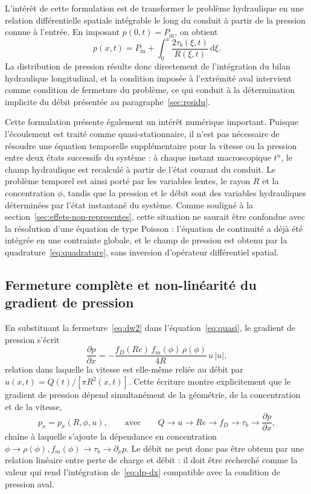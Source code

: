 \documentclass[11pt,a4paper]{report}
\begin{document}
L'intérêt de cette formulation est de transformer le problème hydraulique en une relation différentielle
spatiale intégrable le long du conduit à partir de la pression connue à l'entrée. En imposant
\(p(0,t) = P_{\mathrm{in}}\), on obtient
\begin{equation}
p(x,t) = P_{\mathrm{in}} + \int_0^x \frac{2\tau_b(\xi,t)}{R(\xi,t)}\,\mathrm{d}\xi .
\label{eq:quadrature}
\end{equation}
La distribution de pression résulte donc directement de l'intégration du bilan hydraulique longitudinal,
et la condition imposée à l'extrémité aval intervient comme condition de fermeture du problème, ce qui
conduit à la détermination implicite du débit présentée au paragraphe~\ref{sec:residu}.

Cette formulation présente également un intérêt numérique important. Puisque l'écoulement est traité comme
quasi-stationnaire, il n'est pas nécessaire de résoudre une équation temporelle supplémentaire pour la
vitesse ou la pression entre deux états successifs du système : à chaque instant macroscopique \(t^n\), le
champ hydraulique est recalculé à partir de l'état courant du conduit. Le problème temporel est ainsi
porté par les variables lentes, le rayon \(R\) et la concentration \(\phi\), tandis que la pression et le
débit sont des variables hydrauliques déterminées par l'état instantané du système. Comme souligné à la
section~\ref{sec:effets-non-representes}, cette situation ne saurait être confondue avec la résolution
d'une équation de type Poisson : l'équation de continuité a déjà été intégrée en une contrainte globale,
et le champ de pression est obtenu par la quadrature~\eqref{eq:quadrature}, sans inversion d'opérateur
différentiel spatial.

\subsection{Fermeture complète et non-linéarité du gradient de pression}

En substituant la fermeture~\eqref{eq:dw2} dans l'équation~\eqref{eq:quasi}, le gradient de pression
s'écrit
\begin{equation}
\frac{\partial p}{\partial x}
= -\frac{f_D(Re)\,f_m(\phi)\,\rho(\phi)}{4R}\,u\,|u|,
\label{eq:dp-dx}
\end{equation}
relation dans laquelle la vitesse est elle-même reliée au débit par \(u(x,t) = Q(t)/\left[\pi R^2(x,t)\right]\).
Cette écriture montre explicitement que le gradient de pression dépend simultanément de la géométrie, de
la concentration et de la vitesse,
\begin{equation}
p_x = p_x\left(R,\phi,u\right),
\qquad\text{avec}\qquad
Q \to u \to Re \to f_D \to \tau_b \to \frac{\partial p}{\partial x},
\label{eq:chaine-non-lineaire}
\end{equation}
chaîne à laquelle s'ajoute la dépendance en concentration
\(\phi \to \rho(\phi), f_m(\phi) \to \tau_b \to \partial_x p\). Le débit ne peut donc pas être obtenu par
une relation linéaire entre perte de charge et débit : il doit être recherché comme la valeur qui rend
l'intégration de~\eqref{eq:dp-dx} compatible avec la condition de pression aval.
\end{document}
